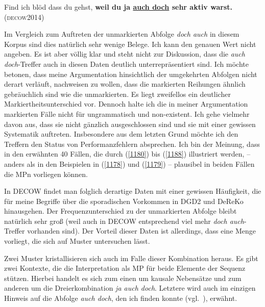 \begin{exe}
	\ex\label{1188} 

	Find ich blöd dass du gehst, \textbf{weil du ja \ul{auch doch} sehr aktiv warst.}	
	\hfill\hbox{\scshape(decow2014)}	
	
	
\end{exe}						
Im Vergleich zum Auftreten der unmarkierten Abfolge \textit{doch auch} in diesem Kor\-pus sind dies natürlich sehr wenige Belege. Ich kann den genauen Wert nicht angeben. Es ist aber völlig klar und steht nicht zur Diskussion, dass die \textit{auch doch}-Treffer auch in diesen Daten deutlich unterrepräsentiert sind. Ich möchte betonen, dass meine Argumentation hinsichtlich der umgekehrten Abfolgen nicht derart verläuft, nachweisen zu wollen, dass die markierten Reihungen ähnlich gebräuchlich sind wie die unmarkierten. Es liegt zweifellos ein deutlicher Markiert\-heitsunterschied  vor. Dennoch halte ich die in meiner Argumentation markierten Fälle nicht für ungrammatisch und non-existent. Ich gehe vielmehr davon aus, dass sie nicht gänzlich ausgeschlossen sind und sie mit einer gewissen Systema\-tik auftreten. Insbesondere aus dem letzten Grund möchte ich den Treffern den Status von Performanzfehlern absprechen. Ich bin der Meinung, dass in den erwähnten 40 Fällen, die durch (\ref{1180}) bis (\ref{1188}) illustriert werden, – anders als in den Beispielen in (\ref{1178}) und (\ref{1179}) – plausibel in beiden Fällen die MPn vorliegen können.

In DECOW findet man folglich derartige Daten mit einer gewissen Häufigkeit, die für meine Begriffe über die sporadischen Vorkommen in DGD2 und DeReKo hinausgehen. Der Frequenzunterschied zu der unmarkierten Abfolge bleibt natürlich sehr groß (weil auch in DECOW entsprechend viel mehr \textit{doch auch}-Treffer vorhanden sind). Der Vorteil dieser Daten ist allerdings, dass eine Menge vorliegt, die sich auf Muster untersuchen lässt.

Zwei Muster kristallisieren sich auch im Falle dieser Kombination heraus. Es gibt zwei Kontexte, die die Interpretation als MP für beide Elemente der Sequenz stützen. Hierbei handelt es sich zum einen um kausale Nebensätze und zum anderen um die Dreierkombination \textit{ja auch doch}. Letztere wird auch im einzigen Hinweis auf die Abfolge \textit{auch doch}, den ich finden konnte (vgl.\ \citealt[254]{Hentschel1986}), erwähnt. 

